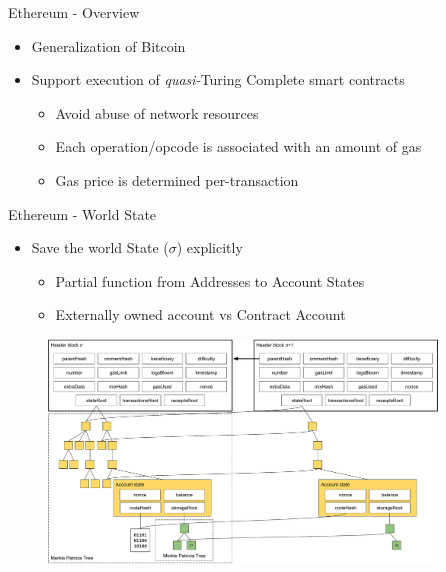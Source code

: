 \begin{frame}{Ethereum - Overview~\cite{bib:yellow}}
    \begin{itemize}
        \item Generalization of Bitcoin
        \item Support execution of \emph{quasi-}Turing Complete smart contracts
        \begin{itemize}
            \item Avoid abuse of network resources
            \item Each operation/opcode is associated with
            an amount of gas %
            \item Gas price is determined per-transaction
        \end{itemize}
    \end{itemize}
\end{frame}

\begin{frame}{Ethereum - World State~\cite{bib:yellow}}
    \begin{itemize}
    \item Save the world State ($\sigma$) explicitly
    \begin{itemize}
     \item Partial function from Addresses to Account States
     \item Externally owned account vs Contract Account
    \end{itemize}
    \end{itemize}

    \begin{figure}
        \begin{center}
            \includegraphics[width=0.92\textwidth]{./img/world-state}
        \end{center}
    \end{figure}
\end{frame}

